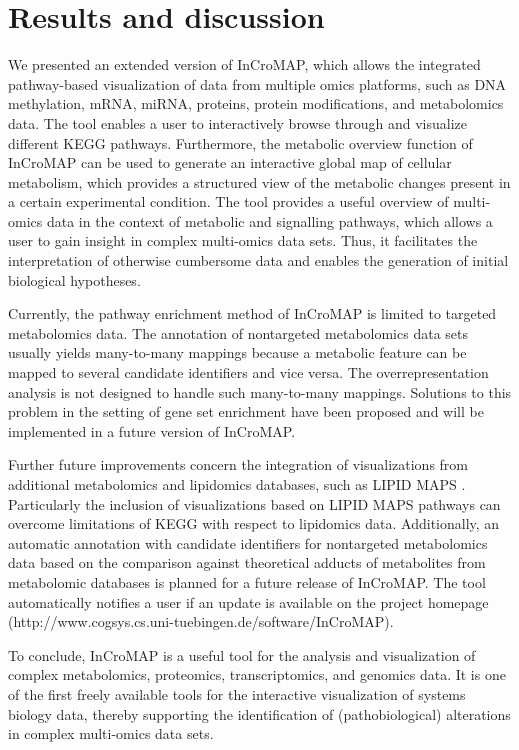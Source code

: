 \documentclass[final,5p,times,twocolumn]{elsarticle}
\begin{document}
\section{Results and discussion}
We presented an extended version of InCroMAP, which allows the integrated pathway-based visualization of data from multiple omics platforms, such as DNA methylation, mRNA, miRNA, proteins, protein modifications, and metabolomics data. The tool enables a user to interactively browse through and visualize different KEGG pathways. Furthermore, the metabolic overview function of InCroMAP can be used to generate an interactive global map of cellular metabolism, which provides a structured view of the metabolic changes present in a certain experimental condition. The tool provides a useful overview of multi-omics data in the context of metabolic and signalling pathways, which allows a user to gain insight in complex multi-omics data sets. Thus, it facilitates the interpretation of otherwise cumbersome data and enables the generation of initial biological hypotheses. 

Currently, the pathway enrichment method of InCroMAP is limited to targeted metabolomics data. The annotation of nontargeted metabolomics data sets usually yields many-to-many mappings because a metabolic feature can be mapped to several candidate identifiers and vice versa. The overrepresentation analysis is not designed to handle such many-to-many mappings. Solutions to this problem in the setting of gene set enrichment have been proposed \cite{Kankainen2011} and will be implemented in a future version of InCroMAP.

Further future improvements concern the integration of visualizations from additional metabolomics and lipidomics databases, such as LIPID MAPS \cite{Sud2007}. Particularly the inclusion of visualizations based on LIPID MAPS pathways can overcome limitations of KEGG with respect to lipidomics data. Additionally, an automatic annotation with candidate identifiers for nontargeted metabolomics data based on the comparison against theoretical adducts of metabolites from metabolomic databases is planned for a future release of InCroMAP. The tool automatically notifies a user if an update is available on the project homepage (http://www.cogsys.cs.uni-tuebingen.de/software/InCroMAP).

To conclude, InCroMAP is a useful tool for the analysis and visualization of complex metabolomics, proteomics, transcriptomics, and genomics data. It is one of the first freely available tools for the interactive visualization of systems biology data, thereby supporting the identification of (pathobiological) alterations in complex multi-omics data sets.
\end{document}
